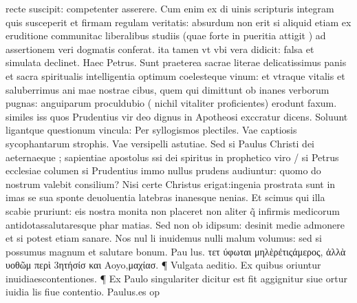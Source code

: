 \documentclass{article}
\begin{document}
\begin{pages}
recte suscipit: competenter asserere. Cum enim ex di uinis scripturis integram quis susceperit et firmam regulam veritatis: absurdum non erit si aliquid etiam ex eruditione communitac liberalibus studiis (quae forte in pueritia attigit ) ad assertionem veri dogmatis conferat. ita tamen vt vbi vera didicit: falsa et simulata declinet. Haec Petrus. Sunt praeterea sacrae literae delicatissimus panis et sacra spiritualis intelligentia optimum coelesteque vinum: et vtraque vitalis et saluberrimus ani mae nostrae cibus, quem qui dimittunt ob inanes verborum pugnas: anguiparum proculdubio ( nichil vitaliter proficientes) erodunt faxum. similes iss quos Prudentius vir deo dignus in Apotheosi exccratur dicens. Soluunt ligantque questionum vincula: Per syllogismos plectiles. Vae captiosis sycophantarum strophis. Vae versipelli astutiae.  \pend\pstart Sed si Paulus Christi dei aeternaeque ; sapientiae apostolus ssi dei spiritus in prophetico viro / si Petrus ecclesiae columen si Prudentius immo nullus prudens audiuntur: quomo do nostrum valebit consilium? Nisi certe Christus erigat:ingenia prostrata sunt in imas se sua sponte deuoluentia latebras inanesque nenias. Et scimus qui illa scabie pruriunt: eis nostra monita non placeret non aliter q̃ infirmis medicorum antidotassalutaresque phar matias. Sed non ob idipsum: desinit medie admonere et si potest etiam sanare. Nos nul li inuidemus nulli malum volumus: sed si possumus magnum et salutare bonum. Pau lus. τετ ύφωται μηλὲρἐτιςάμερος, ἀλλὰ υοθῶμ περὶ 3ητήσίσ και Aoyo,μαχίασ. ¶ Vulgata aeditio. Ex quibus oriuntur inuidiaescontentiones. ¶ Ex Paulo singulariter dicitur est fit aggignitur siue ortur iuidia lis fiue contentio. Paulus.es op  \pend

\end{pages}
\end{document}
